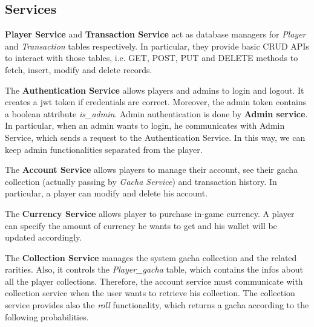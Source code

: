 \documentclass{article}
\begin{document}

\subsection{Services}
\textbf{Player Service} and \textbf{Transaction Service} act as database managers for \emph{Player} and \emph{Transaction} tables respectively. In particular, they provide basic CRUD APIs to interact with those tables, i.e. GET, POST, PUT and DELETE methods to fetch, insert, modify and delete records.

The \textbf{Authentication Service} allows players and admins to login and logout. It creates a jwt token if credentials are correct. Moreover, the admin token contains a boolean attribute \emph{is\_admin}. Admin authentication is done by \textbf{Admin service}. In particular, when an admin wants to login, he communicates with Admin Service, which sends a request to the Authentication Service. In this way, we can keep admin functionalities separated from the player.

The \textbf{Account Service} allows players to manage their account, see their gacha collection (actually passing by \emph{Gacha Service}) and transaction history. In particular, a player can modify and delete his account.

The \textbf{Currency Service} allows player to purchase in-game currency. A player can specify the amount of currency he wants to get and his wallet will be updated accordingly.

The \textbf{Collection Service} manages the system gacha collection and the related rarities. Also, it controls the \emph{Player\_gacha} table, which contains the infos about all the player collections. Therefore, the account service must communicate with collection service when the user wants to retrieve his collection. The collection service provides also the \emph{roll} functionality, which returns a gacha according to the following probabilities.
\end{document}
